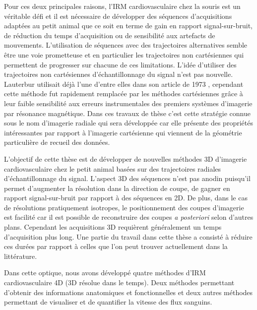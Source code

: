 \medbreak
Pour ces deux principales raisons, l'IRM cardiovasculaire chez la souris est un véritable défi et il est nécessaire de développer des séquences d'acquisitions adaptées au petit animal que ce soit en terme de gain en rapport signal-sur-bruit, de réduction du temps d'acquisition ou de sensibilité aux artefacts de mouvements. L'utilisation de séquences avec des trajectoires alternatives semble être une voie prometteuse et en particulier les trajectoires non cartésiennes qui permettent de progresser sur chacune de ces limitations. L'idée d'utiliser des trajectoires non cartésiennes d'échantillonnage du signal n'est pas nouvelle. Lauterbur utilisait déjà l'une d'entre elles dans son article de 1973 \cite{lauterbur1973image}, cependant cette méthode fut rapidement remplacée par les méthodes cartésiennes grâce à leur faible sensibilité aux erreurs instrumentales des premiers systèmes d'imagerie par résonance magnétique. Dans ces travaux de thèse c'est cette stratégie connue sous le nom d'imagerie radiale qui sera développée car elle présente des propriétés intéressantes par rapport à l'imagerie cartésienne qui viennent de la géométrie particulière de recueil des données.

\medbreak
L'objectif de cette thèse est de développer de nouvelles méthodes 3D d'imagerie cardiovasculaire chez le petit animal basées sur des trajectoires radiales d'échantillonnage du signal. L'aspect 3D des séquences n'est pas anodin puisqu'il permet d'augmenter la résolution dans la direction de coupe, de gagner en rapport signal-sur-bruit par rapport à des séquences en 2D. De plus, dans le cas de résolutions pratiquement isotropes, le positionnement des coupes d'imagerie est facilité car il est possible de reconstruire des coupes \textit{a posteriori} selon d'autres plans. Cependant les acquisitions 3D requièrent généralement un temps d'acquisition plus long. Une partie du travail dans cette thèse a consisté à réduire ces durées par rapport à celles que l'on peut trouver actuellement dans la littérature.

Dans cette optique, nous avons développé quatre méthodes d'IRM cardiovasculaire 4D (3D résolue dans le temps). 
Deux méthodes permettant d'obtenir des informations anatomiques et fonctionnelles et deux autres méthodes permettant de visualiser et de quantifier la vitesse des flux sanguins. 
\medbreak


